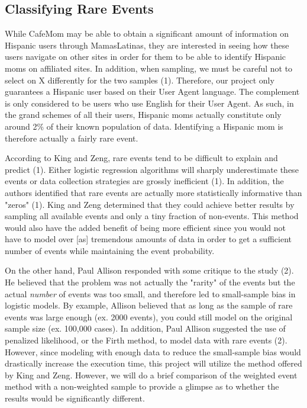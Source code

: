 \documentclass[a4paper]{article}
\begin{document}
\begin{multicols}{2}
\subsection*{Classifying Rare Events}
While CafeMom may be able to obtain a significant amount of information on Hispanic users through MamasLatinas, they are interested in seeing how these users navigate on other sites in order for them to be able to identify Hispanic moms on affiliated sites. In addition, when sampling, we must be careful not to select on X differently for the two samples (1). Therefore, our project only guarantees a Hispanic user based on their User Agent language. The complement is only considered to be users who use English for their User Agent. As such, in the grand schemes of all their users, Hispanic moms actually constitute only around 2\% of their known population of data. Identifying a Hispanic mom is therefore actually a fairly rare event.


According to King and Zeng, rare events tend to be difficult to explain and predict (1). Either logistic regression algorithms will sharply underestimate these events or data collection strategies are grossly inefficient (1). In addition, the authors identified that rare events are actually more statistically informative than "zeros" (1). King and Zeng determined that they could achieve better results by sampling all available events and only a tiny fraction of non-events. This method would also have the added benefit of being more efficient since you would not have to model over [as] tremendous amounts of data in order to get a sufficient number of events while maintaining the event probability.


On the other hand, Paul Allison responded with some critique to the study (2). He believed that the problem was not actually the "rarity" of the events but the actual \emph{number} of events was too small, and therefore led to small-sample bias in logistic models. By example, Allison believed that as long as the sample of rare events was large enough (ex. 2000 events), you could still model on the original sample size (ex. 100,000 cases). In addition, Paul Allison suggested the use of penalized likelihood, or the Firth method, to model data with rare events (2). However, since modeling with enough data to reduce the small-sample bias would drastically increase the execution time, this project will utilize the method offered by King and Zeng. However, we will do a brief comparison of the weighted event method with a non-weighted sample to provide a glimpse as to whether the results would be significantly different.



\end{multicols}
\end{document}
